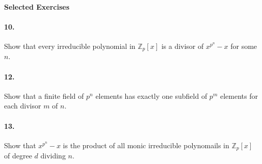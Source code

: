 \documentclass[10pt,a4paper]{article}
\begin{document}
\paragraph{Selected Exercises}

\paragraph{10.} Show that every irreducible polynomial in $\mathbb{Z}_p[x]$ is a divisor of $x^{p^n}-x$ for some $n$.

\paragraph{12.} Show that a finite field of $p^n$ elements has exactly one subfield of $p^m$ elements for each divisor $m$ of $n$.

\paragraph{13.} Show that $x^{p^n}-x$ is the product of all monic irreducible polynomails in $\mathbb{Z}_p[x]$ of degree $d$ dividing $n$.
\end{document}
